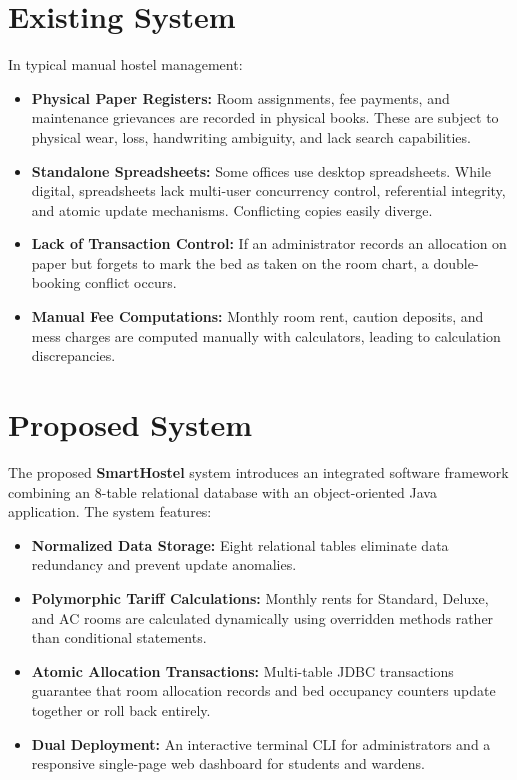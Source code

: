 \documentclass[12pt,a4paper]{report}
\begin{document}
\section{Existing System}
In typical manual hostel management:
\begin{itemize}
\item \textbf{Physical Paper Registers:} Room assignments, fee payments, and maintenance grievances are recorded in physical books. These are subject to physical wear, loss, handwriting ambiguity, and lack search capabilities.
\item \textbf{Standalone Spreadsheets:} Some offices use desktop spreadsheets. While digital, spreadsheets lack multi-user concurrency control, referential integrity, and atomic update mechanisms. Conflicting copies easily diverge.
\item \textbf{Lack of Transaction Control:} If an administrator records an allocation on paper but forgets to mark the bed as taken on the room chart, a double-booking conflict occurs.
\item \textbf{Manual Fee Computations:} Monthly room rent, caution deposits, and mess charges are computed manually with calculators, leading to calculation discrepancies.
\end{itemize}

\section{Proposed System}
The proposed \textbf{SmartHostel} system introduces an integrated software framework combining an 8-table relational database with an object-oriented Java application. The system features:
\begin{itemize}
\item \textbf{Normalized Data Storage:} Eight relational tables eliminate data redundancy and prevent update anomalies.
\item \textbf{Polymorphic Tariff Calculations:} Monthly rents for Standard, Deluxe, and AC rooms are calculated dynamically using overridden methods rather than conditional statements.
\item \textbf{Atomic Allocation Transactions:} Multi-table JDBC transactions guarantee that room allocation records and bed occupancy counters update together or roll back entirely.
\item \textbf{Dual Deployment:} An interactive terminal CLI for administrators and a responsive single-page web dashboard for students and wardens.
\end{itemize}
\end{document}

